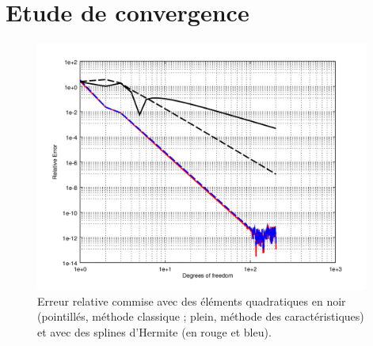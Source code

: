 \section{Etude de convergence}

\begin{figure}[!ht]
	\centering
	\includegraphics[width=11cm]{part4/figs/herm_comp.png}
	\caption{\label{fig:compp_quad_herm}Erreur relative commise avec des éléments quadratiques en noir (pointillés,
	méthode classique ; plein, méthode des caractéristiques) et avec des splines d'Hermite (en rouge et bleu).}
\end{figure}
